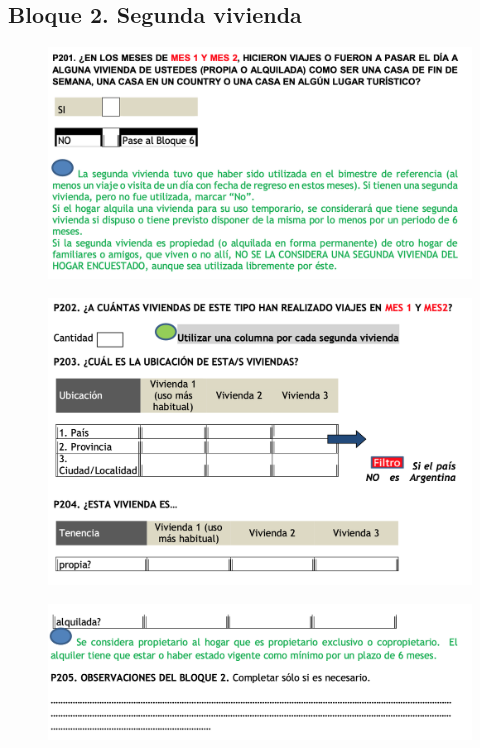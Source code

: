 \documentclass[
  openany]{book}
\begin{document}
\hypertarget{bloque-2.-segunda-vivienda}{%
\subsection{Bloque 2. Segunda vivienda}\label{bloque-2.-segunda-vivienda}}

\begin{figure}

{\centering \includegraphics[width=1\linewidth]{imagenes/figura6-155} 

}

\end{figure}
\begin{figure}

{\centering \includegraphics[width=1\linewidth]{imagenes/figura6-156} 

}

\end{figure}
\begin{figure}

{\centering \includegraphics[width=1\linewidth]{imagenes/figura6-157} 

}

\end{figure}
\end{document}
